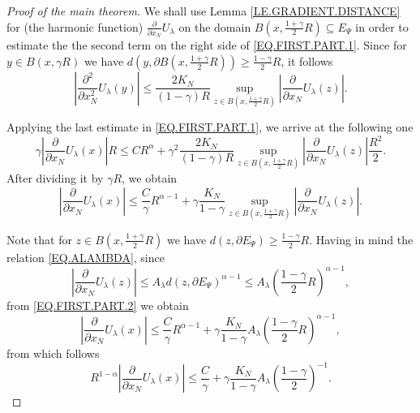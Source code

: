 \documentclass[10pt]{amsart}
\theoremstyle{definition}
\numberwithin{equation}{section}
\begin{document}
\begin{proof}[Proof of the main theorem]
We shall use Lemma  \ref{LE.GRADIENT.DISTANCE}  for  (the harmonic function) $\frac {\partial} {\partial x_N} U_\lambda$
on the domain  $B(x, \frac {1+\gamma}2 R)\subseteq  E_\Psi$ in   order  to estimate  the  the second term on  the  right
side of \eqref{EQ.FIRST.PART.1}. Since  for $y\in {B}(x,\gamma R)$ we  have
$d(y,\partial B(x,\frac {1+\gamma}2 R))\ge \frac{1-\gamma}2 R$,  it follows
\begin{equation*}
\left|\frac {\partial^2} {\partial x_N^2} U_\lambda(y)\right|  \le
\frac {2K_N}{(1-\gamma) R} \sup_{z\in {B}(x,\frac{1+\gamma}2 R)}
\left |\frac {\partial} {\partial x_N}U_\lambda(z)\right|.
\end{equation*}

Applying the last estimate in  \eqref{EQ.FIRST.PART.1}, we arrive  at the following one
\begin{equation*}
\gamma\left| \frac {\partial } {\partial  x_N}  U_\lambda (x) \right| R \le
C R ^{\alpha} + \gamma^2 \frac {2K_N}{(1-\gamma) R} \sup_{z\in {B}(x,\frac{1+\gamma}2 R)} 
\left |\frac {\partial} {\partial x_N} U_\lambda(z)\right|\frac {R^2}2 .
\end{equation*}
After dividing it  by $\gamma R$, we obtain
\begin{equation}\label{EQ.FIRST.PART.2}
\left| \frac {\partial } {\partial  x_N} U_\lambda (x) \right| \le \frac{C} \gamma R ^{\alpha-1}
+   {\gamma} \frac {K_N}{{1-\gamma}} \sup_{z\in {B}(x,\frac{1+\gamma}2 R)}
\left |\frac {\partial} {\partial x_N}U_\lambda(z)\right|.
\end{equation}

Note that for $z\in {B}(x,\frac{1+\gamma}2 R)$ we have $d(z, \partial E_\Psi) \ge \frac {1-\gamma}2 R $. Having in  mind
the relation  \eqref{EQ.ALAMBDA}, since
\begin{equation*}
\left| \frac {\partial} {\partial x_N} U _\lambda (z)\right|
\le A_\lambda d(z,\partial E_\Psi)^{ \alpha-1}
\le A_\lambda \left( \frac {1-\gamma}2 R\right)^{ \alpha-1},
\end{equation*}
from \eqref{EQ.FIRST.PART.2} we obtain
\begin{equation*}
\left| \frac {\partial } {\partial x_N} U_\lambda (x)\right|
\le \frac{C}\gamma R^{\alpha-1}
+  \gamma  \frac { K_N}{1-\gamma} A_\lambda \left(\frac {1-\gamma}2 R \right)^{\alpha - 1},
\end{equation*}
from  which follows
\begin{equation}\label{EQ.LAST.ESTIMATE}
R^{1-\alpha}\left| \frac {\partial } {\partial x_N} U_\lambda(x)\right|
\le \frac{C}\gamma +  \gamma \frac{K_N}{1-\gamma}  A_\lambda \left(\frac {1-\gamma}2\right)^{ - 1}.
\end{equation}


\end{proof}
\end{document}
